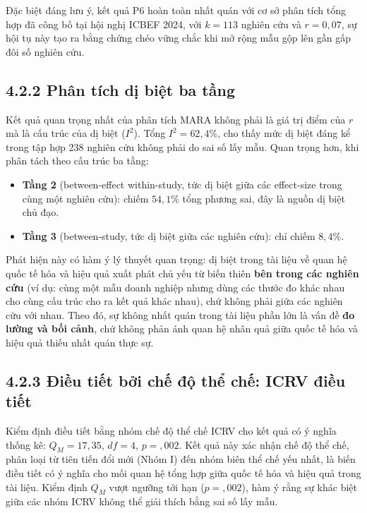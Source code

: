 \documentclass[
  a4paper,
  13pt]{extreport}
\providecommand{\tightlist}{%
  \setlength{\itemsep}{0pt}\setlength{\parskip}{0pt}}
\begin{document}
Đặc biệt đáng lưu ý, kết quả P6 hoàn toàn nhất quán với cơ sở phân tích
tổng hợp đã công bố tại hội nghị ICBEF 2024, với \(k = 113\) nghiên cứu
và \(r = 0{,}07\), sự hội tụ này tạo ra bằng chứng chéo vững chắc khi mở
rộng mẫu gộp lên gần gấp đôi số nghiên cứu.

\hypertarget{phuxe2n-tuxedch-dux1ecb-biux1ec7t-ba-tux1ea7ng}{%
\subsection{4.2.2 Phân tích dị biệt ba
tầng}\label{phuxe2n-tuxedch-dux1ecb-biux1ec7t-ba-tux1ea7ng}}

Kết quả quan trọng nhất của phân tích MARA không phải là giá trị điểm
của \(r\) mà là cấu trúc của dị biệt (\(I^2\)). Tổng \(I^2 = 62{,}4\%\),
cho thấy mức dị biệt đáng kể trong tập hợp 238 nghiên cứu không phải do
sai số lấy mẫu. Quan trọng hơn, khi phân tách theo cấu trúc ba tầng:

\begin{itemize}
\tightlist
\item
  \textbf{Tầng 2} (between-effect within-study, tức dị biệt giữa các
  effect-size trong cùng một nghiên cứu): chiếm \(54{,}1\%\) tổng phương
  sai, đây là nguồn dị biệt chủ đạo.
\item
  \textbf{Tầng 3} (between-study, tức dị biệt giữa các nghiên cứu): chỉ
  chiếm \(8{,}4\%\).
\end{itemize}

Phát hiện này có hàm ý lý thuyết quan trọng: dị biệt trong tài liệu về
quan hệ quốc tế hóa và hiệu quả xuất phát chủ yếu từ biến thiên
\textbf{bên trong các nghiên cứu} (ví dụ: cùng một mẫu doanh nghiệp
nhưng dùng các thước đo khác nhau cho cùng cấu trúc cho ra kết quả khác
nhau), chứ không phải giữa các nghiên cứu với nhau. Theo đó, sự không
nhất quán trong tài liệu phần lớn là vấn đề \textbf{đo lường và bối
cảnh}, chứ không phản ánh quan hệ nhân quả giữa quốc tế hóa và hiệu quả
thiếu nhất quán thực sự.

\hypertarget{ux111iux1ec1u-tiux1ebft-bux1edfi-chux1ebf-ux111ux1ed9-thux1ec3-chux1ebf-icrv-ux111iux1ec1u-tiux1ebft}{%
\subsection{4.2.3 Điều tiết bởi chế độ thể chế: ICRV điều
tiết}\label{ux111iux1ec1u-tiux1ebft-bux1edfi-chux1ebf-ux111ux1ed9-thux1ec3-chux1ebf-icrv-ux111iux1ec1u-tiux1ebft}}

Kiểm định điều tiết bằng nhóm chế độ thể chế ICRV cho kết quả có ý nghĩa
thống kê: \(Q_M = 17{,}35\), \(df = 4\), \(p = {,}002\). Kết quả này xác
nhận chế độ thể chế, phân loại từ tiên tiến đổi mới (Nhóm I) đến nhóm
biên thể chế yếu nhất, là biến điều tiết có ý nghĩa cho mối quan hệ tổng
hợp giữa quốc tế hóa và hiệu quả trong tài liệu. Kiểm định \(Q_M\) vượt
ngưỡng tới hạn (\(p = {,}002\)), hàm ý rằng sự khác biệt giữa các nhóm
ICRV không thể giải thích bằng sai số lấy mẫu.
\end{document}
